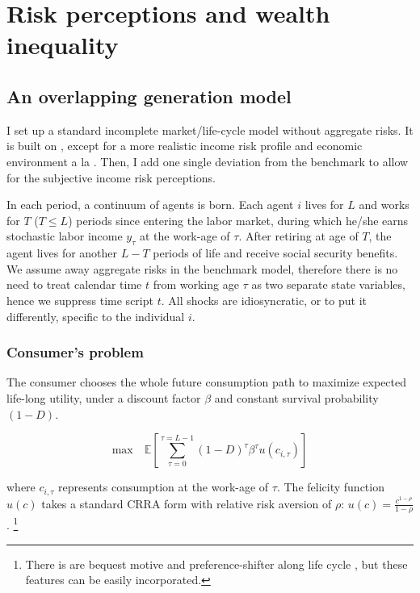 \hypertarget{model_pe}{%
\section{Risk perceptions and wealth inequality}\label{model_pe}}

\subsection{An overlapping generation model}


I set up a standard incomplete market/life-cycle model without aggregate risks. It is built on \cite{huggett1996wealth}, except for  a more realistic income risk profile and economic environment a la \cite{krueger2016macroeconomics,carroll2017distribution}. Then, I add one single deviation from the benchmark to allow for the subjective income risk perceptions. 

In each period, a continuum of agents is born. Each agent $i$ lives for $L$ and works for $T$ ($T\leq L$) periods since entering the labor market, during which he/she earns stochastic labor income \(y_\tau\) at the
work-age of \(\tau\). After retiring at age of \(T\), the agent lives
for another \(L-T\) periods of life and receive social security benefits. We assume away aggregate risks in the benchmark model, therefore there is no need to treat calendar time $t$ from working age $\tau$ as two separate state variables, hence we suppress time script $t$. All shocks are idiosyncratic, or to put it differently, specific to the individual $i$. 


\subsubsection{Consumer's problem}

The consumer chooses the whole future consumption path to maximize
expected life-long utility, under a discount factor $\beta$ and constant survival probability $(1-D)$. 

\begin{equation}
\textrm{max}\quad  \mathbb{E}\left[\sum^{\tau=L-1}_{\tau=0}(1-D)^\tau\beta^\tau u(c_{i,\tau})\right] 
\end{equation}


where $c_{i,\tau}$ represents consumption at the work-age of $\tau$. The
felicity function $u(c)$ takes a standard CRRA form with relative risk
aversion of $\rho$: $u(c) = \frac{c^{1-\rho}}{1-\rho}$.  \footnote{There is are bequest motive and
preference-shifter along life cycle 
, but these features can be easily incorporated.}


